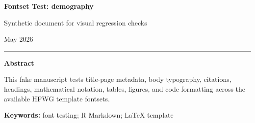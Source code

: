 \documentclass[12pt]{article}
\newif\ifhfwganon
\begin{document}
\begin{titlepage}
\thispagestyle{empty}
\vspace*{0.12\textheight}
\begin{center}
\begin{singlespace}

{\LARGE\bfseries Fontset Test: demography\par}

\vspace{0.35em}
{\large Synthetic document for visual regression checks\par}

\vspace{2.2em}

\hfwgauthorblock

\par\vspace{1.5\baselineskip}
\hfwgseriesblock

\ifhfwganon\else
\vspace{0.35em}
{\small May 2026}\par
\fi

\vspace{2.2\baselineskip}
\noindent\rule{0.35\textwidth}{0.4pt}\par
\vspace{0.65em}
\begin{minipage}{0.78\textwidth}
\small\singlespacing
\textbf{Abstract}\par\vspace{0.3em}
This fake manuscript tests title-page metadata, body typography,
citations, headings, mathematical notation, tables, figures, and code
formatting across the available HFWG template fontsets.
\par\vspace{0.6em}
\textbf{Keywords:} font testing; R Markdown; LaTeX template
\end{minipage}

\end{singlespace}
\end{center}
\vfill
\end{titlepage}
\else
\end{document}
